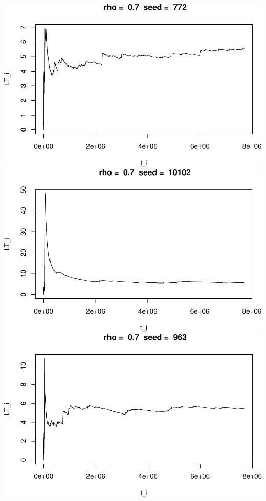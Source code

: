 \documentclass[]{article}
\begin{document}
\includegraphics{003_files/figure-latex/unnamed-chunk-16-1.pdf}
\includegraphics{003_files/figure-latex/unnamed-chunk-16-2.pdf}
\includegraphics{003_files/figure-latex/unnamed-chunk-16-3.pdf}
\end{document}
